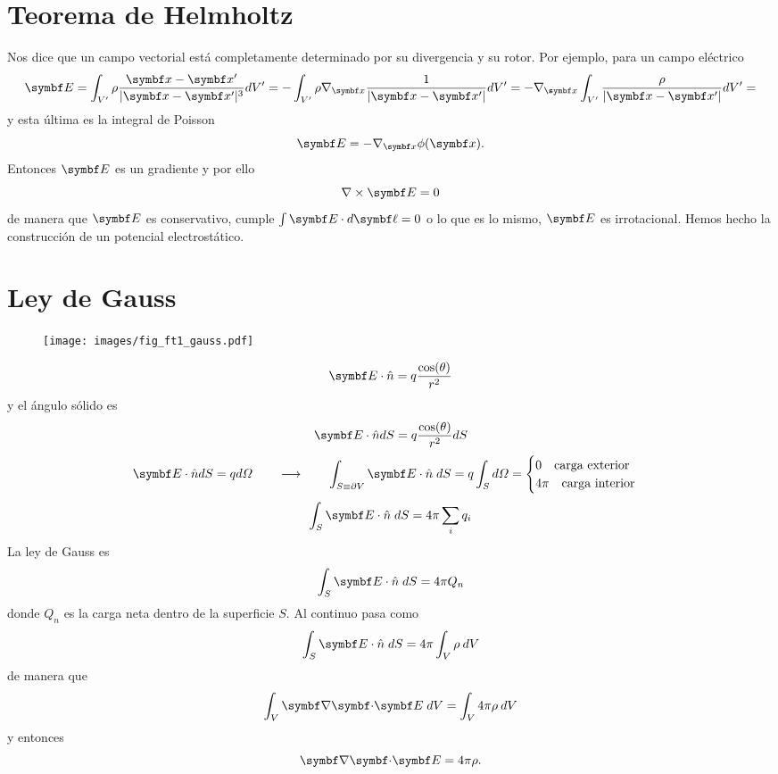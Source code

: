 \documentclass[10pt,oneside]{CBFT_book}
\begin{document}
\section{Teorema de Helmholtz}

Nos dice que un campo vectorial está completamente determinado por su divergencia y su rotor.
Por ejemplo, para un campo eléctrico 
\[
	\vb{E} = \int_{V'} \rho \frac{\vb{x} - \vb{x}'}{|\vb{x} - \vb{x}'|^3} dV' = 
		- \int_{V'} \rho \nabla_{\vb{x}} \frac{ 1 }{|\vb{x} - \vb{x}'|} dV' = 
		- \nabla_{\vb{x}} \int_{V'}   \frac{ \rho }{|\vb{x} - \vb{x}'|} dV' = 
\]
y esta última es la integral de Poisson
\[
	\vb{E} = - \nabla_{\vb{x}} \phi (\vb{x}).
\]
Entonces $\vb{E}$ es un gradiente y por ello 
\[
	\nabla  \times \vb{E} = 0
\]
de manera que $\vb{E}$ es conservativo, cumple $\int \vb{E}\cdot d\vb{\ell} = 0$ o lo que
es lo mismo, $\vb{E}$ es irrotacional.
Hemos hecho la construcción de un potencial electrostático.

\section{Ley de Gauss}



\begin{figure}[htb]
	\begin{center}
	\texttt{[image: images/fig\_ft1\_gauss.pdf]}	 
	\end{center}
	\caption{}
\end{figure} 
\[
	\vb{E} \cdot \hat{n} = q \frac{\cos(\theta)}{r^2}
\]
y el ángulo sólido es
\[
	\vb{E} \cdot \hat{n} dS = q \frac{\cos(\theta)}{r^2} dS
\]
\[
	\vb{E} \cdot \hat{n} dS = q d\Omega \qquad \longrightarrow \qquad 
	\int_{S\equiv\partial V} \vb{E} \cdot \hat{n} \; dS = q \int_S d\Omega =
	\begin{cases}
	 0 \quad \textrm{carga exterior}\\
	 4\pi \quad \textrm{carga interior}
	\end{cases}
\]
\[
	\int_S \vb{E} \cdot \hat{n} \; dS = 4\pi \sum_i q_i
\]
La ley de Gauss es
\[
	\int_S \vb{E} \cdot \hat{n} \; dS = 4\pi Q_n
\]
donde $Q_n$ es la carga neta dentro de la superficie $S$. Al continuo pasa como 
\[
	\int_S \vb{E} \cdot \hat{n} \; dS = 4\pi \int_V \rho \: dV
\]
de manera que 
\[
	\int_V \divem{E} \; dV = \int_V 4\pi \rho \: dV
\]
y entonces
\[
	\divem{E} = 4\pi \rho.
\]
\end{document}
